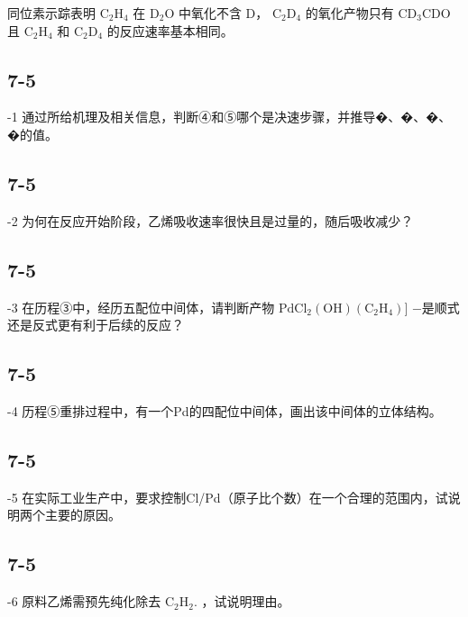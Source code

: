 同位素⽰踪表明 $\mathrm { C _ { 2 } H _ { 4 } }$ 在 $\mathrm { D } _ { 2 } \mathrm { O }$ 中氧化不含 D， $\mathrm { C _ { 2 } D _ { 4 } }$ 的氧化产物只有 $\mathrm { C D _ { 3 } C D O }$ 且 $\mathrm { C _ { 2 } H _ { 4 } }$ 和 $\mathrm { C _ { 2 } D _ { 4 } }$ 的反应速率基本相同。

\subsection*{7-5}
-1 通过所给机理及相关信息，判断④和⑤哪个是决速步骤，并推导�、�、�、�的值。

\subsection*{7-5}
-2 为何在反应开始阶段，⼄烯吸收速率很快且是过量的，随后吸收减少？

\subsection*{7-5}
-3 在历程③中，经历五配位中间体，请判断产物 $\mathrm { P d C l _ { 2 } ( O H ) ( C _ { 2 } H _ { 4 } ) } ]$ −是顺式还是反式更有利于后续的反应？

\subsection*{7-5}
-4 历程⑤重排过程中，有⼀个Pd的四配位中间体，画出该中间体的⽴体结构。

\subsection*{7-5}
-5 在实际⼯业⽣产中，要求控制Cl/Pd（原⼦⽐个数）在⼀个合理的范围内，试说明两个主要的原因。

\subsection*{7-5}
-6 原料⼄烯需预先纯化除去 $\mathrm { C _ { 2 } H _ { 2 } } .$ ，试说明理由。
